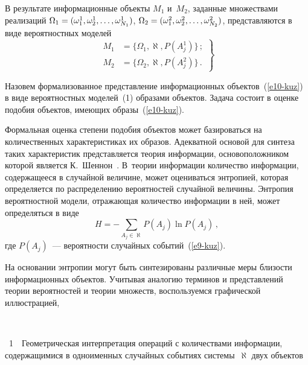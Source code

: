 \begin{multicols}{2}
  В результате информационные объекты $M_1$ и~$M_2$, заданные
множествами реализаций $\Omega_1\hm= (\omega_1^1, \omega_2^1,
 \ldots , \omega^1_{N_1})$, $\Omega_2\hm= (\omega_1^2,
\omega_2^2, \ldots , \omega^2_{N_2})$, представляются в виде
вероятностных моделей
  \begin{equation}
  \label{e10-kuz}
  \left.
  \begin{array}{rl}
  M_1 &=\{ \Omega_1,\aleph, P(A_j^1)\}\,; %
  \\[9pt]
  M_2 &= \{\Omega_2, \aleph, P(A_j^2)\}\,. %
  \end{array}
  \right\}
\end{equation}

  Назовем формализованное представление информационных
объектов~(\ref{e10-kuz}) в виде вероятностных моделей~(1) образами объектов. Задача состоит
в оценке подобия объектов, имеющих образы~(\ref{e10-kuz}).

  Формальная оценка степени подобия объектов может базироваться на
количественных характеристиках их образов. Адекватной основой для синтеза
таких характеристик представляется теория информации, основоположником
которой является К.~Шеннон~\cite{13-kuz}. В~теории информации количество
информации, содержащееся в случайной величине, может оцениваться энтропией,
которая определяется по распределению вероятностей случайной величины.
Энтропия вероятностной модели, отражающая количество информации в ней,
может определяться в виде
  \begin{equation}
  H=-\sum\limits_{A_j\in \aleph} P(A_j) \ln P(A_j)\,,
  \label{e11-kuz}
  \end{equation}
где $P(A_j)$~--- вероятности случайных событий~(\ref{e9-kuz}).

  На основании энтропии могут быть синтезированы различные меры близости
информационных объектов. Учитывая аналогию терминов и пред\-став\-ле\-ний
теории вероятностей и теории множеств, воспользуемся графической
иллюстрацией,\linebreak\vspace*{-12pt}


\noindent
\begin{center}  %
 \mbox{%
 \epsfxsize=76.556mm
 }
  \end{center}
{{\figurename~1}\ \ \small{Геометрическая интерпретация  операций с количествами информации,
содержащимися в одноименных случайных событиях системы~$\aleph$ двух объектов}}


\end{multicols}
